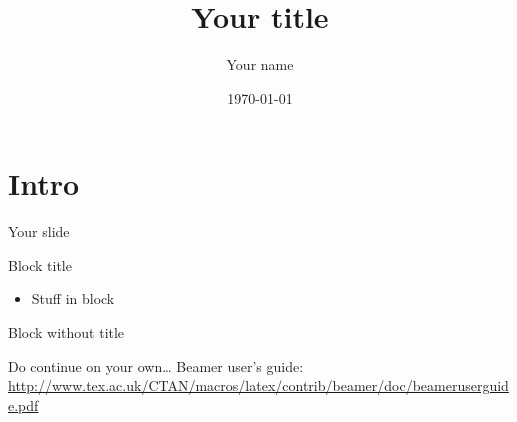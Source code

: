 \documentclass[xcolor=dvipsnames]{beamer}
\title{Your title}
\author[your.email@crs4.it]{Your name}
\institute[CRS4]{Your Group\\
\vspace{1em}
	\texttt{[image: img/CRS4-colori.pdf]}}%
\date{\today}
\begin{document}

\begin{frame}
\titlepage
\end{frame}

\section{Intro}

\begin{frame}{Your slide}
	\begin{block}{Block title}
		\begin{itemize}
			\item Stuff in block
		\end{itemize}
	\end{block}

	\begin{block}{}
		Block without title
	\end{block}

	\begin{block}{Do continue on your own\ldots}
		Beamer user's guide:
		\url{http://www.tex.ac.uk/CTAN/macros/latex/contrib/beamer/doc/beameruserguide.pdf}
	\end{block}
\end{frame}
\end{document}
